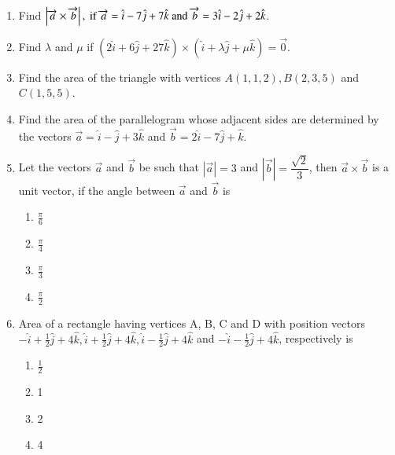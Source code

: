 \begin{enumerate}[label=\thesection.\arabic*,ref=\thesection.\theenumi]
		\item Find $\left\vert\overrightarrow{a}\times\overrightarrow{b}\right\vert,\text{ if }\overrightarrow{a}=\hat{i}-7\hat{j}+7\hat{k}\text{ and } \overrightarrow{b}=3\hat{i}-2\hat{j}+2\hat{k}$.
	\\
		\solution
		
\item Find $\lambda$ and $\mu$ if $(2\hat{i}+6\hat{j}+27\hat{k})\times(\hat{i}+\lambda \hat{j} + \mu \hat{k})=\overrightarrow{0}$.
	\\
		\solution
		
\item Find the area of the triangle with vertices $A(1, 1, 2), B(2, 3, 5)$ and $C(1, 5, 5)$.
	\\
		\solution
		
\item Find the area of the parallelogram whose adjacent sides are determined by the vectors $\overrightarrow{a}=\hat{i}-\hat{j}+3\hat{k}$ and $\overrightarrow{b}=2\hat{i}-7\hat{j}+\hat{k}$.
	\\
		\solution
		
\item Let the vectors $\overrightarrow{a}$ and $\overrightarrow{b}$ be such that $|\overrightarrow{a}| = 3$ and $|\overrightarrow{b}| = \dfrac{\sqrt{2}}{3}$, then $\overrightarrow{a} \times \overrightarrow{b}$ is a unit vector, if the angle between $\overrightarrow{a}$ and $\overrightarrow{b}$ is
\begin{enumerate}
\item $\frac{\pi}{6}$
\item $\frac{\pi}{4}$
\item $\frac{\pi}{3}$
\item $\frac{\pi}{2}$
\end{enumerate}
		\solution
		
\item Area of a rectangle having vertices A, B, C and D with position vectors $ -\hat{i}+ \frac{1}{2} \hat{j}+4\hat{k}, \hat{i}+ \frac{1}{2} \hat{j}+4\hat{k}, \hat{i}-\frac{1}{2} \hat{j}+4\hat{k}$ and $-\hat{i}- \frac{1}{2} \hat{j}+4\hat{k}$, respectively is
\begin{enumerate}
\item $\frac{1}{2}$
\item 1
\item 2
\item 4
\end{enumerate}

\end{enumerate}
